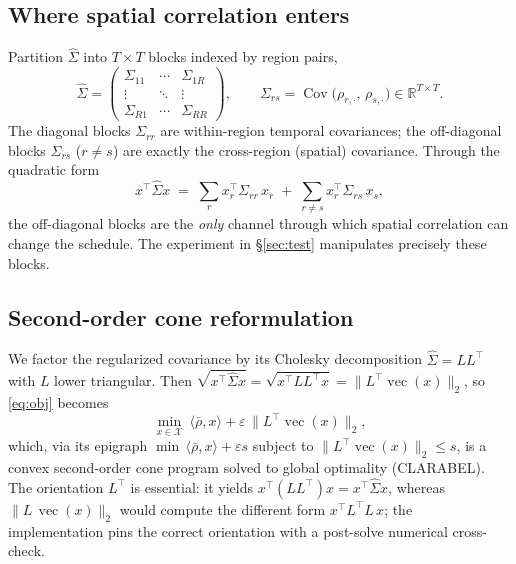 \documentclass[11pt]{article}
\newcommand{\vecx}{\operatorname{vec}}
\newcommand{\Cov}{\operatorname{Cov}}
\newcommand{\R}{\mathbb{R}}
\begin{document}
\subsection{Where spatial correlation enters}
Partition $\hat\Sigma$ into $T\times T$ blocks indexed by region pairs,
\begin{equation}
  \hat\Sigma=\begin{pmatrix}\Sigma_{11}&\cdots&\Sigma_{1R}\\ \vdots&\ddots&\vdots\\
  \Sigma_{R1}&\cdots&\Sigma_{RR}\end{pmatrix},
  \qquad \Sigma_{rs}=\Cov\!\big(\rho_{r,\cdot},\,\rho_{s,\cdot}\big)\in\R^{T\times T}.
  \label{eq:blocks}
\end{equation}
The diagonal blocks $\Sigma_{rr}$ are within-region temporal covariances; the off-diagonal blocks
$\Sigma_{rs}$ ($r\ne s$) are exactly the cross-region (spatial) covariance. Through the quadratic form
\begin{equation}
  x^\top\hat\Sigma x \;=\; \sum_{r} x_r^\top \Sigma_{rr}\, x_r \;+\; \sum_{r\ne s} x_r^\top \Sigma_{rs}\, x_s,
  \label{eq:quad}
\end{equation}
the off-diagonal blocks are the \emph{only} channel through which spatial correlation can change the
schedule. The experiment in \S\ref{sec:test} manipulates precisely these blocks.

\subsection{Second-order cone reformulation}
We factor the regularized covariance by its Cholesky decomposition $\hat\Sigma = L L^{\top}$ with $L$
lower triangular. Then $\sqrt{x^{\top}\hat\Sigma x}=\sqrt{x^{\top}LL^{\top}x}=\lVert L^{\top}\vecx(x)\rVert_2$,
so \eqref{eq:obj} becomes
\begin{equation}
  \min_{x\in\mathcal{X}}\ \langle\bar\rho,x\rangle+\varepsilon\,\big\lVert L^{\top}\vecx(x)\big\rVert_{2},
  \label{eq:socp}
\end{equation}
which, via its epigraph $\min\,\langle\bar\rho,x\rangle+\varepsilon s$ subject to
$\lVert L^{\top}\vecx(x)\rVert_2\le s$, is a convex second-order cone program solved to global
optimality (CLARABEL). The orientation $L^{\top}$ is essential: it yields $x^\top(LL^\top)x=x^\top\hat\Sigma x$,
whereas $\lVert L\,\vecx(x)\rVert_2$ would compute the different form $x^\top L^\top L\,x$; the
implementation pins the correct orientation with a post-solve numerical cross-check.
\end{document}

